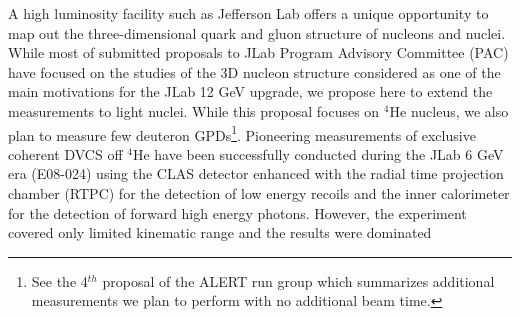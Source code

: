 A high luminosity facility such as Jefferson Lab offers a unique opportunity to 
map out the three-dimensional quark and gluon structure of nucleons and nuclei.  
While most of submitted proposals to JLab Program Advisory Committee (PAC) have 
focused on the studies of the 3D nucleon structure considered as one of the 
main motivations for the JLab 12 GeV upgrade, we propose here to extend the 
measurements to light nuclei. While this proposal focuses on $^4$He nucleus, we 
also plan to measure few deuteron GPDs\footnote{See the 4$^{th}$ proposal of 
the ALERT run group which summarizes additional measurements we plan to perform 
with no additional beam time.}. Pioneering measurements of exclusive coherent 
DVCS off $^4$He have been successfully conducted during the JLab 6 GeV era 
(E08-024) using the CLAS detector enhanced with the radial time projection 
chamber (RTPC) for the detection of low energy recoils and the inner 
calorimeter for the detection of forward high energy photons. However, the 
experiment covered only limited kinematic range and the results were dominated 

